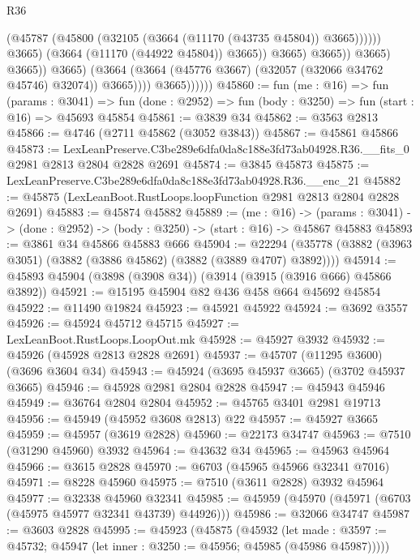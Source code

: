 \begin{lexlean}{R36}
\begin{coremodule}
                                            (@45787
                                              (@45800
                                                (@32105 (@3664 (@11170 (@43735 @45804)) @3665))))))
                                        @3665)
                                      (@3664 (@11170 (@44922 @45804)) @3665))
                                    @3665)
                                  @3665))
                              @3665)
                            @3665))
                        @3665)
                      (@3664 (@3664 (@45776 @3667) (@32057 (@32066 @34762 @45746) @32074)) @3665))))
                @3665))))))
@45860 := fun (me : @16) =>
  fun (params : @3041) =>
  fun (done : @2952) => fun (body : @3250) => fun (start : @16) => @45693 @45854
@45861 := @3839 @34
@45862 := @3563 @2813
@45866 := @4746 (@2711 @45862 (@3052 @3843))
@45867 := @45861 @45866
@45873 := LexLeanPreserve.C3be289e6dfa0da8c188e3fd73ab04928.R36.__fits_0
    @2981
    @2813
    @2804
    @2828
    @2691
@45874 := @3845 @45873
@45875 := LexLeanPreserve.C3be289e6dfa0da8c188e3fd73ab04928.R36.__enc_21
@45882 := @45875 (LexLeanBoot.RustLoops.loopFunction @2981 @2813 @2804 @2828 @2691)
@45883 := @45874 @45882
@45889 := (me : @16) ->
  (params : @3041) -> (done : @2952) -> (body : @3250) -> (start : @16) -> @45867 @45883
@45893 := @3861 @34 @45866 @45883 @666
@45904 := @22294 (@35778 (@3882 (@3963 @3051) (@3882 (@3886 @45862) (@3882 (@3889 @4707) @3892))))
@45914 := @45893 @45904 (@3898 (@3908 @34)) (@3914 (@3915 (@3916 @666) @45866 @3892))
@45921 := @15195 @45904 @82 @436 @458 @664 @45692 @45854
@45922 := @11490 @19824
@45923 := @45921 @45922
@45924 := @3692 @3557
@45926 := @45924 @45712 @45715
@45927 := LexLeanBoot.RustLoops.LoopOut.mk
@45928 := @45927 @3932
@45932 := @45926 (@45928 @2813 @2828 @2691)
@45937 := @45707 (@11295 @3600) (@3696 @3604 @34)
@45943 := @45924 (@3695 @45937 @3665) (@3702 @45937 @3665)
@45946 := @45928 @2981 @2804 @2828
@45947 := @45943 @45946
@45949 := @36764 @2804 @2804
@45952 := @45765 @3401 @2981 @19713
@45956 := @45949 (@45952 @3608 @2813) @22
@45957 := @45927 @3665
@45959 := @45957 (@3619 @2828)
@45960 := @22173 @34747
@45963 := @7510 (@31290 @45960) @3932
@45964 := @43632 @34
@45965 := @45963 @45964
@45966 := @3615 @2828
@45970 := @6703 (@45965 @45966 @32341 @7016)
@45971 := @8228 @45960
@45975 := @7510 (@3611 @2828) @3932 @45964
@45977 := @32338 @45960 @32341
@45985 := @45959 (@45970 (@45971 (@6703 (@45975 @45977 @32341 @43739) @44926)))
@45986 := @32066 @34747
@45987 := @3603 @2828
@45995 := @45923
    (@45875
      (@45932
        (let made : @3597 := @45732; @45947 (let inner : @3250 := @45956; @45985 (@45986 @45987)))))

\end{coremodule}
\end{lexlean}
